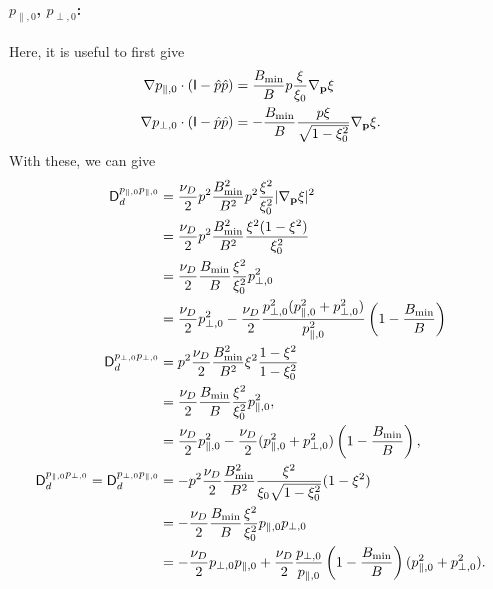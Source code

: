 \documentclass[11pt,a4paper]{article}
\newcommand{\sub}[1]{\ensuremath{_{\text{#1}}}}
\renewcommand{\b}[1]{\ensuremath{ {\bf #1 } }}
\begin{document}
\paragraph{$p_{\parallel,0}$, $p_{\perp,0}$:}
Here, it is useful to first give
\begin{align}
\nabla p_{\parallel,0} \cdot (\mathsf{I}-\hat{p}\hat{p}) &= \frac{B\sub{min}}{B}p\frac{\xi}{\xi_0}\nabla_\b{p}\xi \nonumber \\ %
\nabla p_{\perp,0} \cdot (\mathsf{I}-\hat{p}\hat{p}) &= -\frac{B\sub{min}}{B}\frac{p\xi}{\sqrt{1-\xi_0^2}}\nabla_\b{p}\xi.
\end{align}
With these, we can give 
\begin{align}
\mathsf{D}_d^{p_{\parallel,0}p_{\parallel,0}} &= \frac{\nu_D}{2} p^2 \frac{B\sub{min}^2}{B^2}p^2\frac{\xi^2}{\xi_0^2}|\nabla_\b{p}\xi|^2 \nonumber \\
&= \frac{\nu_D}{2}p^2\frac{B\sub{min}^2}{B^2} \frac{\xi^2(1-\xi^2)}{\xi_0^2} \nonumber \\
&= \frac{\nu_D}{2}\frac{B\sub{min}}{B}\frac{\xi^2}{\xi_0^2}p_{\perp,0}^2 \nonumber \\
&=  \frac{\nu_D}{2}p_{\perp,0}^2-  \frac{\nu_D}{2}\frac{p_{\perp,0}^2(p_{\parallel,0}^2+p_{\perp,0}^2)}{p_{\parallel,0}^2}\left(1-\frac{B\sub{min}}{B}\right)  \nonumber \\
\mathsf{D}_d^{p_{\perp,0}p_{\perp,0}} &= p^2 \frac{\nu_D}{2}\frac{B\sub{min}^2}{B^2} \xi^2\frac{1-\xi^2}{1-\xi_0^2} \nonumber \\
&= \frac{\nu_D}{2}\frac{B\sub{min}}{B}\frac{\xi^2}{\xi_0^2}p_{\parallel,0}^2, \nonumber \\
&= \frac{\nu_D}{2}p_{\parallel,0}^2 -  \frac{\nu_D}{2}(p_{\parallel,0}^2+p_{\perp,0}^2) \left(1-\frac{B\sub{min}}{B}\right), \nonumber \\
\mathsf{D}_d^{p_{\parallel,0}p_{\perp,0}} = \mathsf{D}_d^{p_{\perp,0}p_{\parallel,0}} &= -p^2 \frac{\nu_D}{2}\frac{B\sub{min}^2}{B^2}\frac{\xi^2}{\xi_0\sqrt{1-\xi_0^2}}(1-\xi^2) \nonumber \\
&= -\frac{\nu_D}{2}\frac{B\sub{min}}{B}\frac{\xi^2}{\xi_0^2}p_{\parallel,0}p_{\perp,0} \nonumber \\
&=- \frac{\nu_D}{2} p_{\perp,0}p_{\parallel,0} + \frac{\nu_D}{2} \frac{p_{\perp,0}}{p_{\parallel,0}}\left(1-\frac{B\sub{min}}{B}\right)(p_{\parallel,0}^2+p_{\perp,0}^2). \nonumber
\end{align}
\end{document}
